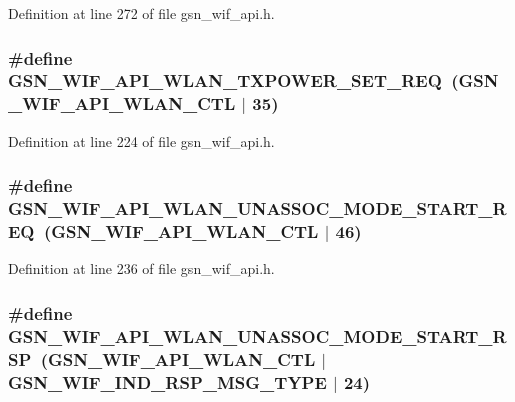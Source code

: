 Definition at line 272 of file gsn\_\-wif\_\-api.h.

\hypertarget{a00606_adc79bfe57e012e6c591f9f4faa5dc5c7}{
\subsubsection[{GSN\_\-WIF\_\-API\_\-WLAN\_\-TXPOWER\_\-SET\_\-REQ}]{\setlength{\rightskip}{0pt plus 5cm}\#define GSN\_\-WIF\_\-API\_\-WLAN\_\-TXPOWER\_\-SET\_\-REQ~(GSN\_\-WIF\_\-API\_\-WLAN\_\-CTL $|$ 35)}}
\label{a00606_adc79bfe57e012e6c591f9f4faa5dc5c7}


Definition at line 224 of file gsn\_\-wif\_\-api.h.

\hypertarget{a00606_a083be1997e604c2fd50a5f603933d9c1}{
\subsubsection[{GSN\_\-WIF\_\-API\_\-WLAN\_\-UNASSOC\_\-MODE\_\-START\_\-REQ}]{\setlength{\rightskip}{0pt plus 5cm}\#define GSN\_\-WIF\_\-API\_\-WLAN\_\-UNASSOC\_\-MODE\_\-START\_\-REQ~(GSN\_\-WIF\_\-API\_\-WLAN\_\-CTL $|$ 46)}}
\label{a00606_a083be1997e604c2fd50a5f603933d9c1}


Definition at line 236 of file gsn\_\-wif\_\-api.h.

\hypertarget{a00606_ad2fe3d876eeb0f842b25d997a0ea34ea}{
\subsubsection[{GSN\_\-WIF\_\-API\_\-WLAN\_\-UNASSOC\_\-MODE\_\-START\_\-RSP}]{\setlength{\rightskip}{0pt plus 5cm}\#define GSN\_\-WIF\_\-API\_\-WLAN\_\-UNASSOC\_\-MODE\_\-START\_\-RSP~(GSN\_\-WIF\_\-API\_\-WLAN\_\-CTL $|$ GSN\_\-WIF\_\-IND\_\-RSP\_\-MSG\_\-TYPE $|$ 24)}}
\label{a00606_ad2fe3d876eeb0f842b25d997a0ea34ea}


